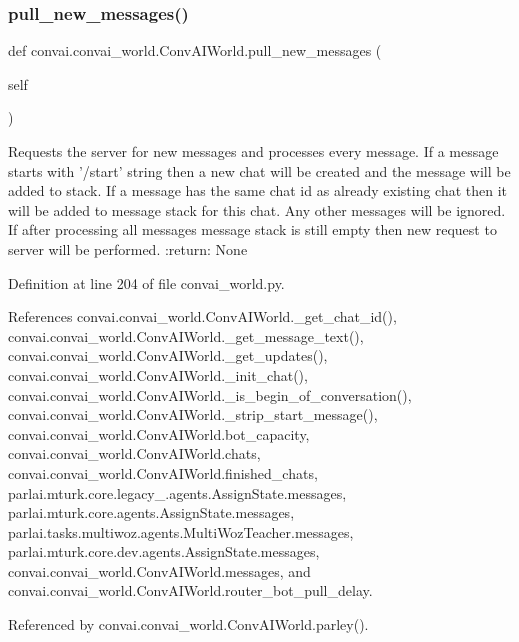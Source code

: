 \subsubsection{\texorpdfstring{pull\+\_\+new\+\_\+messages()}{pull\_new\_messages()}}
{\footnotesize\ttfamily def convai.\+convai\+\_\+world.\+Conv\+A\+I\+World.\+pull\+\_\+new\+\_\+messages (\begin{DoxyParamCaption}\item[{}]{self }\end{DoxyParamCaption})}

\begin{DoxyVerb}Requests the server for new messages and processes every message.
If a message starts with '/start' string then a new chat will be created and
the message will be added to stack.
If a message has the same chat id as already existing chat then it will be
added to message stack for this chat.
Any other messages will be ignored.
If after processing all messages message stack is still empty then new request
to server will be performed.
:return: None
\end{DoxyVerb}
 

Definition at line 204 of file convai\+\_\+world.\+py.



References convai.\+convai\+\_\+world.\+Conv\+A\+I\+World.\+\_\+get\+\_\+chat\+\_\+id(), convai.\+convai\+\_\+world.\+Conv\+A\+I\+World.\+\_\+get\+\_\+message\+\_\+text(), convai.\+convai\+\_\+world.\+Conv\+A\+I\+World.\+\_\+get\+\_\+updates(), convai.\+convai\+\_\+world.\+Conv\+A\+I\+World.\+\_\+init\+\_\+chat(), convai.\+convai\+\_\+world.\+Conv\+A\+I\+World.\+\_\+is\+\_\+begin\+\_\+of\+\_\+conversation(), convai.\+convai\+\_\+world.\+Conv\+A\+I\+World.\+\_\+strip\+\_\+start\+\_\+message(), convai.\+convai\+\_\+world.\+Conv\+A\+I\+World.\+bot\+\_\+capacity, convai.\+convai\+\_\+world.\+Conv\+A\+I\+World.\+chats, convai.\+convai\+\_\+world.\+Conv\+A\+I\+World.\+finished\+\_\+chats, parlai.\+mturk.\+core.\+legacy\+\_.\+agents.\+Assign\+State.\+messages, parlai.\+mturk.\+core.\+agents.\+Assign\+State.\+messages, parlai.\+tasks.\+multiwoz.\+agents.\+Multi\+Woz\+Teacher.\+messages, parlai.\+mturk.\+core.\+dev.\+agents.\+Assign\+State.\+messages, convai.\+convai\+\_\+world.\+Conv\+A\+I\+World.\+messages, and convai.\+convai\+\_\+world.\+Conv\+A\+I\+World.\+router\+\_\+bot\+\_\+pull\+\_\+delay.



Referenced by convai.\+convai\+\_\+world.\+Conv\+A\+I\+World.\+parley().


